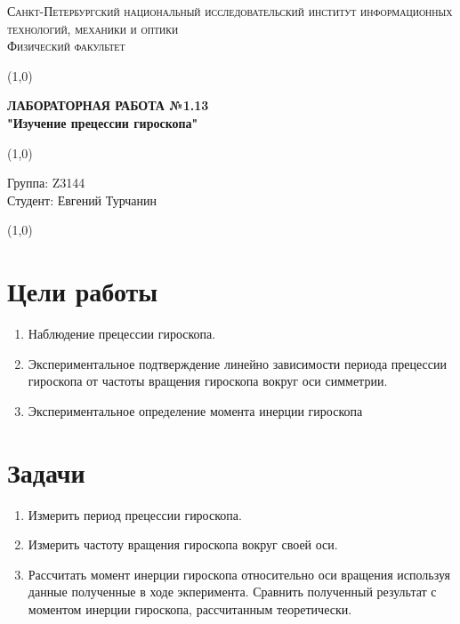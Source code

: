 \documentclass[a4paper]{article}
\begin{document}
\begin{center}
\textsc{Санкт-Петербургский национальный исследовательский институт информационных технологий, механики и оптики\\[3mm]
Физический факультет} \\[3mm]

\end{center}
\vspace{5mm}
\line(1,0){\textwidth}
\begin{center}
\textbf{ЛАБОРАТОРНАЯ РАБОТА №1.13\\}
\textbf{"Изучение прецессии гироскопа"}
\end{center}
\vspace{2mm}
\line(1,0){\textwidth}
\vspace{5mm}
\begin{minipage}{0.4\textwidth}
    Группа: Z3144 \\
    Студент: Евгений Турчанин\\
    \vspace{1mm}
\end{minipage}
\hfill
\vspace{1mm}
\line(1,0){\textwidth}



\section{\textbf{Цели работы}}
\begin{enumerate}
\item Наблюдение прецессии гироскопа.
\item Экспериментальное подтверждение линейно зависимости периода прецессии гироскопа от частоты вращения гироскопа вокруг оси симметрии.
\item Экспериментальное определение момента инерции гироскопа
\end{enumerate}



\section{\textbf{Задачи}}
\begin{enumerate}
\item Измерить период прецессии гироскопа.
\item Измерить частоту вращения гироскопа вокруг своей оси.
\item Рассчитать момент инерции гироскопа относительно оси вращения используя данные полученные в ходе экперимента. Сравнить полученный результат с моментом инерции гироскопа, рассчитанным теоретически.
\end{enumerate}
\end{document}
